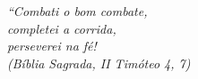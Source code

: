 \begin{epigrafe}
    \vspace*{\fill}
	\begin{flushright}
		
		\textit{``Combati o bom combate, \\
		completei a corrida, \\
		perseverei na fé! \\
		(Bíblia Sagrada, II Timóteo 4, 7)}
	\end{flushright}
\end{epigrafe}
  